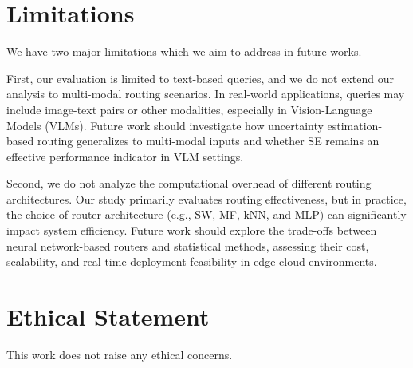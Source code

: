 \section{Limitations}
We have two major limitations which we aim to address in future works. 

First, our evaluation is limited to text-based queries, and we do not extend our analysis to multi-modal routing scenarios. In real-world applications, queries may include image-text pairs or other modalities, especially in Vision-Language Models (VLMs). Future work should investigate how uncertainty estimation-based routing generalizes to multi-modal inputs and whether SE remains an effective performance indicator in VLM settings.

Second, we do not analyze the computational overhead of different routing architectures. Our study primarily evaluates routing effectiveness, but in practice, the choice of router architecture (e.g., SW, MF, kNN, and MLP) can significantly impact system efficiency. Future work should explore the trade-offs between neural network-based routers and statistical methods, assessing their cost, scalability, and real-time deployment feasibility in edge-cloud environments.

\section{Ethical Statement}
This work does not raise any ethical concerns. 
